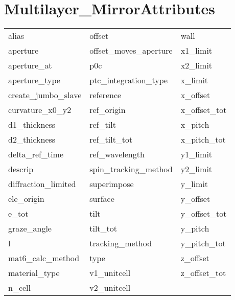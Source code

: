 \section{Multilayer_MirrorAttributes}
 \label{s:list.multilayer.mirror}
 
 \begin{tabular}{lll} \toprule
alias                       & offset                      & wall                        \\
aperture                    & offset_moves_aperture       & x1_limit                    \\
aperture_at                 & p0c                         & x2_limit                    \\
aperture_type               & ptc_integration_type        & x_limit                     \\
create_jumbo_slave          & reference                   & x_offset                    \\
curvature_x0_y2             & ref_origin                  & x_offset_tot                \\
d1_thickness                & ref_tilt                    & x_pitch                     \\
d2_thickness                & ref_tilt_tot                & x_pitch_tot                 \\
delta_ref_time              & ref_wavelength              & y1_limit                    \\
descrip                     & spin_tracking_method        & y2_limit                    \\
diffraction_limited         & superimpose                 & y_limit                     \\
ele_origin                  & surface                     & y_offset                    \\
e_tot                       & tilt                        & y_offset_tot                \\
graze_angle                 & tilt_tot                    & y_pitch                     \\
l                           & tracking_method             & y_pitch_tot                 \\
mat6_calc_method            & type                        & z_offset                    \\
material_type               & v1_unitcell                 & z_offset_tot                \\
n_cell                      & v2_unitcell                 &                             \\
 \bottomrule
 \end{tabular}
 \vfill
 
